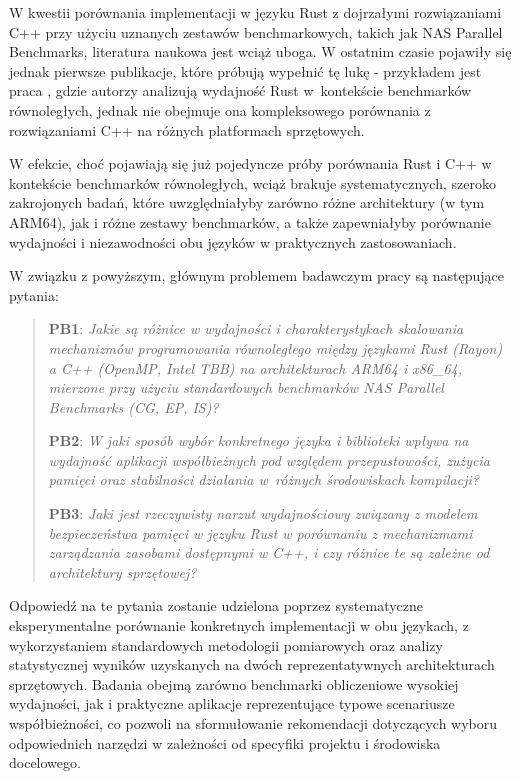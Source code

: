 W kwestii porównania implementacji w języku Rust z dojrzałymi rozwiązaniami C++ przy użyciu uznanych zestawów benchmarkowych, takich jak NAS Parallel Benchmarks, literatura naukowa jest wciąż uboga. W ostatnim czasie pojawiły się jednak pierwsze publikacje, które próbują wypełnić tę lukę - przykładem jest praca \cite{martins2025npbrustnasparallelbenchmarks}, gdzie autorzy analizują wydajność Rust w~kontekście benchmarków równoległych, jednak nie obejmuje ona kompleksowego porównania z rozwiązaniami C++ na różnych platformach sprzętowych.

W efekcie, choć pojawiają się już pojedyncze próby porównania Rust i C++ w kontekście benchmarków równoległych, wciąż brakuje systematycznych, szeroko zakrojonych badań, które uwzględniałyby zarówno różne architektury (w tym ARM64), jak i różne zestawy benchmarków, a także zapewniałyby porównanie wydajności i niezawodności obu języków w praktycznych zastosowaniach.

W związku z powyższym, głównym problemem badawczym pracy są następujące pytania:
\begin{quote}
    \item \textbf{PB1}: 
    \emph{Jakie są różnice w wydajności i charakterystykach skalowania mechanizmów programowania równoległego między językami Rust (Rayon) a C++ (OpenMP, Intel TBB) na architekturach ARM64 i x86\_64, mierzone przy użyciu standardowych benchmarków NAS Parallel Benchmarks (CG, EP, IS)?}
    \item \textbf{PB2}:
    \emph{W jaki sposób wybór konkretnego języka i biblioteki wpływa na wydajność aplikacji współbieżnych pod względem przepustowości, zużycia pamięci oraz stabilności działania w~różnych środowiskach kompilacji?}
    \item \textbf{PB3}:
    \emph{Jaki jest rzeczywisty narzut wydajnościowy związany z modelem bezpieczeństwa pamięci w języku Rust w porównaniu z mechanizmami zarządzania zasobami dostępnymi w C++, i czy różnice te są zależne od architektury sprzętowej?}
\end{quote}
Odpowiedź na te pytania zostanie udzielona poprzez systematyczne eksperymentalne porównanie konkretnych implementacji w obu językach, z wykorzystaniem standardowych metodologii pomiarowych oraz analizy statystycznej wyników uzyskanych na dwóch reprezentatywnych architekturach sprzętowych. Badania obejmą zarówno benchmarki obliczeniowe wysokiej wydajności, jak i praktyczne aplikacje reprezentujące typowe scenariusze współbieżności, co pozwoli na sformułowanie rekomendacji dotyczących wyboru odpowiednich narzędzi w zależności od specyfiki projektu i środowiska docelowego.

